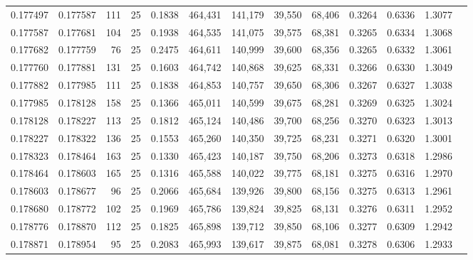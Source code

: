 \begin{tabular}{rrrrrrrrrrrrr}
0.177497 & 0.177587 &   111 &  25 &                                     0.1838 & 464,431 & 141,179 &  39,550 &  68,406 & 0.3264 & 0.6336 & 1.3077 \\
0.177587 & 0.177681 &   104 &  25 &                                     0.1938 & 464,535 & 141,075 &  39,575 &  68,381 & 0.3265 & 0.6334 & 1.3068 \\
0.177682 & 0.177759 &    76 &  25 &                                     0.2475 & 464,611 & 140,999 &  39,600 &  68,356 & 0.3265 & 0.6332 & 1.3061 \\
0.177760 & 0.177881 &   131 &  25 &                                     0.1603 & 464,742 & 140,868 &  39,625 &  68,331 & 0.3266 & 0.6330 & 1.3049 \\
0.177882 & 0.177985 &   111 &  25 &                                     0.1838 & 464,853 & 140,757 &  39,650 &  68,306 & 0.3267 & 0.6327 & 1.3038 \\
0.177985 & 0.178128 &   158 &  25 &                                     0.1366 & 465,011 & 140,599 &  39,675 &  68,281 & 0.3269 & 0.6325 & 1.3024 \\
0.178128 & 0.178227 &   113 &  25 &                                     0.1812 & 465,124 & 140,486 &  39,700 &  68,256 & 0.3270 & 0.6323 & 1.3013 \\
0.178227 & 0.178322 &   136 &  25 &                                     0.1553 & 465,260 & 140,350 &  39,725 &  68,231 & 0.3271 & 0.6320 & 1.3001 \\
0.178323 & 0.178464 &   163 &  25 &                                     0.1330 & 465,423 & 140,187 &  39,750 &  68,206 & 0.3273 & 0.6318 & 1.2986 \\
0.178464 & 0.178603 &   165 &  25 &                                     0.1316 & 465,588 & 140,022 &  39,775 &  68,181 & 0.3275 & 0.6316 & 1.2970 \\
0.178603 & 0.178677 &    96 &  25 &                                     0.2066 & 465,684 & 139,926 &  39,800 &  68,156 & 0.3275 & 0.6313 & 1.2961 \\
0.178680 & 0.178772 &   102 &  25 &                                     0.1969 & 465,786 & 139,824 &  39,825 &  68,131 & 0.3276 & 0.6311 & 1.2952 \\
0.178776 & 0.178870 &   112 &  25 &                                     0.1825 & 465,898 & 139,712 &  39,850 &  68,106 & 0.3277 & 0.6309 & 1.2942 \\
0.178871 & 0.178954 &    95 &  25 &                                     0.2083 & 465,993 & 139,617 &  39,875 &  68,081 & 0.3278 & 0.6306 & 1.2933 \\

\end{tabular}
